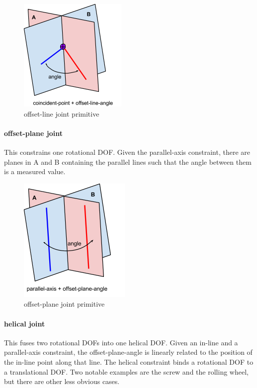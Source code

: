 \documentclass[]{report}
\begin{document}
\begin{figure}[ht!]
	\centering
	\includegraphics[scale=0.7]{images/image01.png}
	\caption{offset-line joint primitive}
	\label{fig:offset-line-primitive}
\end{figure} 
 

\paragraph{offset-plane joint}

This constrains one rotational DOF. 
Given the parallel-axis constraint, there are planes in A and B 
containing the parallel lines such that the angle between them is a measured value. 

\begin{figure}[h!]
	\centering
	\includegraphics[scale=0.7]{images/image09.png}
	\caption{offset-plane joint primitive}
	\label{fig:offset-plane-primitive}
\end{figure}

\paragraph{helical joint}

This fuses two rotational DOFs into one helical DOF. 
Given an in-line and a parallel-axis constraint, 
the offset-plane-angle is linearly related to the position of 
the in-line point along that line. 
The helical constraint binds a rotational DOF to a translational DOF. 
Two notable examples are the screw and the rolling wheel, 
but there are other less obvious cases. 
\end{document}

